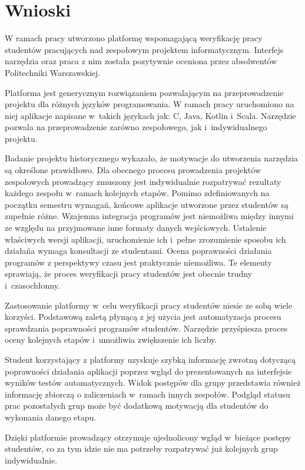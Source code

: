 \chapter{Wnioski}
\label{chapter:conclusion}

W ramach pracy utworzono platformę wspomagającą weryfikację pracy studentów pracujących nad zespołowym projektem informatycznym.
Interfejs narzędzia oraz praca z nim została pozytywnie oceniona przez absolwentów Politechniki Warszawskiej.

Platforma jest generycznym rozwiązaniem pozwalającym na przeprowadzenie projektu dla różnych języków programowania.
W ramach pracy uruchomiono na niej aplikacje napisane w~takich językach jak: C, Java, Kotlin i~Scala.
Narzędzie pozwala na przeprowadzenie zarówno zespołowego, jak i~indywidualnego projektu.

Badanie projektu historycznego wykazało, że motywacje do utworzenia narzędzia są określone prawidłowo.
Dla obecnego procesu prowadzenia projektów zespołowych prowadzący zmuszony jest indywidualnie rozpatrywać rezultaty każdego zespołu w~ramach kolejnych etapów.
Pomimo zdefiniowanych na początku semestru wymagań, końcowe aplikacje utworzone przez studentów są zupełnie różne.
Wzajemna integracja programów jest niemożliwa między innymi ze względu na przyjmowane inne formaty danych wejściowych.
Ustalenie właściwych wersji aplikacji, uruchomienie ich i~pełne zrozumienie sposobu ich działańa wymaga konsultacji ze studentami.
Ocena poprawności działania programów z perspektywy czasu jest praktycznie niemożliwa.
Te elementy sprawiają, że proces weryfikacji pracy studentów jest obecnie trudny i~czasochłonny.

Zastosowanie platformy w~celu weryfikacji pracy studentów niesie ze sobą wiele korzyści.
Podstawową zaletą płynącą z jej użycia jest automatyzacja procesu sprawdzania poprawności programów studentów.
Narzędzie przyśpiesza proces oceny kolejnych etapów i~umożliwia zwiększenie ich liczby.

Student korzystający z platformy uzyskuje szybką informację zwrotną dotyczącą poprawności działania aplikacji poprzez wgląd do prezentowanych na interfejsie wyników testów automatycznych.
Widok postępów dla grupy przedstawia również informację zbiorczą o zaliczeniach w~ramach innych zespołów.
Podgląd statusu prac pozostałych grup może być dodatkową motywacją dla studentów do wykonania danego etapu.

Dzięki platformie prowadzący otrzymuje ujednolicony wgląd w~bieżące postępy studentów, co za tym idzie nie ma potrzeby rozpatrywać już kolejnych grup indywidualnie.

